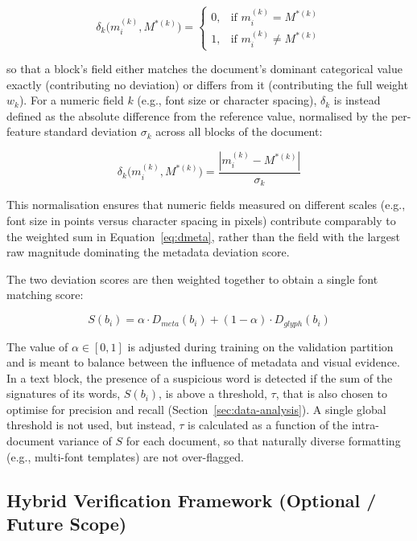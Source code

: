 \begin{equation}
\delta_k\big(m_i^{(k)}, M^{*(k)}\big) =
\begin{cases}
0, & \text{if } m_i^{(k)} = M^{*(k)} \\
1, & \text{if } m_i^{(k)} \neq M^{*(k)}
\end{cases}
\end{equation}

\noindent so that a block's field either matches the document's dominant categorical value exactly (contributing no deviation) or differs from it (contributing the full weight \(w_k\)). For a numeric field \(k\) (e.g., font size or character spacing), \(\delta_k\) is instead defined as the absolute difference from the reference value, normalised by the per-feature standard deviation \(\sigma_k\) across all blocks of the document:

\begin{equation}
\delta_k\big(m_i^{(k)}, M^{*(k)}\big) = \frac{\left| m_i^{(k)} - M^{*(k)} \right|}{\sigma_k}
\end{equation}

\noindent This normalisation ensures that numeric fields measured on different scales (e.g., font size in points versus character spacing in pixels) contribute comparably to the weighted sum in Equation~\eqref{eq:dmeta}, rather than the field with the largest raw magnitude dominating the metadata deviation score.

\noindent The two deviation scores are then weighted together to obtain a single font matching score:

\begin{equation}
S(b_i) = \alpha \cdot D_{meta}(b_i) + (1-\alpha) \cdot D_{glyph}(b_i)
\end{equation}

\noindent The value of \(\alpha \in [0,1]\) is adjusted during training on the validation partition and is meant to balance between the influence of metadata and visual evidence. In a text block, the presence of a suspicious word is detected if the sum of the signatures of its words, \(S(b_i)\), is above a threshold, \(\tau\), that is also chosen to optimise for precision and recall (Section~\ref{sec:data-analysis}). A single global threshold is not used, but instead, \(\tau\) is calculated as a function of the intra-document variance of \(S\) for each document, so that naturally diverse formatting (e.g., multi-font templates) are not over-flagged.

\subsection{Hybrid Verification Framework (Optional / Future Scope)}

